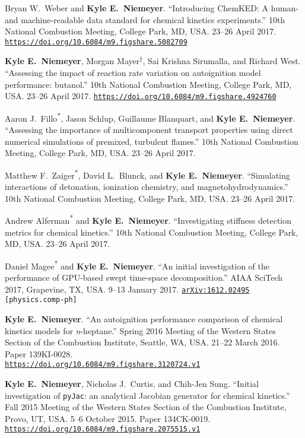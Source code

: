 \documentclass[margin,line,11pt]{res}
\makeatletter
\newlength{\bibhang}
\newlength{\bibsep}
 {\@listi \global\bibsep\itemsep \global\advance\bibsep by\parsep}
\newenvironment{bibenum*}
  {\renewcommand\labelenumi{\theenumi.}%
   \etaremune[
     topsep=0pt,
     itemsep=\bibsep,
     parsep=0pt,partopsep=0pt,
     itemindent=-\bibhang,
     leftmargin={\bibhang+\widthof{[999]}}]}
  {\endetaremune}
\newcommand*{\doi}[1]{\href{https://doi.org/#1}{\nolinkurl{https://doi.org/#1}}}
\newcommand*{\grad}[0]{\textsuperscript{*}}
\newcommand*{\ugrad}[0]{\textsuperscript{$\dagger$}}
\makeatother
\begin{document}
\begin{resume}
\begin{bibenum*}
\item Bryan W.~Weber and \textbf{Kyle E.~Niemeyer}.
``Introducing ChemKED: A human- and machine-readable data standard for chemical kinetics experiments.''
10th National Combustion Meeting, College Park, MD, USA.
23--26 April 2017.
\doi{10.6084/m9.figshare.5082709}

\item \textbf{Kyle E.~Niemeyer}, Morgan Mayer\ugrad{}, Sai Krishna Sirumalla, and Richard West.
``Assessing the impact of reaction rate variation on autoignition model performance: butanol.''
10th National Combustion Meeting, College Park, MD, USA.
23--26 April 2017.
\doi{10.6084/m9.figshare.4924760}

\item Aaron J.~Fillo\grad{}, Jason Schlup, Guillaume Blanquart, and \textbf{Kyle E.~Niemeyer}.
``Assessing the importance of multicomponent transport properties using direct numerical simulations of premixed, turbulent flames.''
10th National Combustion Meeting, College Park, MD, USA.
23--26 April 2017.

\item Matthew F.~Zaiger\grad{}, David L.~Blunck, and \textbf{Kyle E.~Niemeyer}.
``Simulating interactions of detonation, ionization chemistry, and magnetohydrodynamics.''
10th National Combustion Meeting, College Park, MD, USA.
23--26 April 2017.

\item Andrew Alferman\grad{} and \textbf{Kyle E.~Niemeyer}.
``Investigating stiffness detection metrics for chemical kinetics.''
10th National Combustion Meeting, College Park, MD, USA.
23--26 April 2017.

\item Daniel Magee\grad{} and \textbf{Kyle E.~Niemeyer}.
``An initial investigation of the performance of GPU-based swept time-space decomposition.''
AIAA SciTech 2017, Grapevine, TX, USA.
9--13 January 2017.
{\tt \href{https://arxiv.org/abs/1612.02495}{arXiv:1612.02495} [physics.comp-ph]}

\item \textbf{Kyle E.~Niemeyer}. ``An autoignition performance comparison of chemical kinetics models for \emph{n}-heptane.''
Spring 2016 Meeting of the Western States Section of the Combustion Institute, Seattle, WA, USA.
21--22 March 2016.
Paper 139KI-0028. \\
\doi{10.6084/m9.figshare.3120724.v1}

\item \textbf{Kyle E.~Niemeyer}, Nicholas J.\ Curtis, and Chih-Jen Sung. ``Initial investigation of \texttt{pyJac}: an analytical Jacobian generator for chemical kinetics.''
Fall 2015 Meeting of the Western States Section of the Combustion Institute, Provo, UT, USA.
5--6 October 2015.
Paper 134CK-0019.
\doi{10.6084/m9.figshare.2075515.v1}


\end{bibenum*}
\end{resume}
\end{document}
